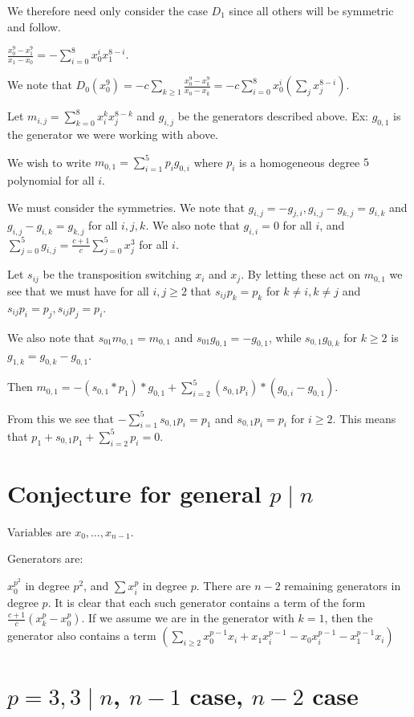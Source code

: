\documentclass{article}
\numberwithin{equation}{section}
\begin{document}
We therefore need only consider the case $D_1$ since all others will be symmetric and follow.

$\frac{x_0^9-x_1^9}{x_1-x_0}=-\sum_{i=0}^8 x_0^ix_1^{8-i}$.

We note that $D_0(x_0^9) = -c\sum_{k \ge 1} \frac{x_0^9-x_k^9}{x_0-x_k} = -c \sum_{i=0}^8 x_0^i(\sum_j x_j^{8-i})$. 

Let $m_{i,j}=\sum_{k=0}^8 x_i^kx_j^{8-k}$ and $g_{i,j}$ be the generators described above. Ex: $g_{0,1}$ is the generator we were working with above. 

We wish to write $m_{0,1}=\sum_{i=1}^5 p_ig_{0,i}$ where $p_i$ is a homogeneous degree $5$ polynomial for all $i$. 

We must consider the symmetries. We note that $g_{i,j}=-g_{j,i}, g_{i,j}-g_{k,j}=g_{i,k}$ and $g_{i,j}-g_{i,k}=g_{k,j}$ for all $i,j,k$. We also note that $g_{i,i}=0$ for all $i$, and $\sum_{j=0}^5 g_{i,j} = \frac{c+1}{c}\sum_{j=0}^5 x_j^3$ for all $i$. 

Let $s_{ij}$ be the transposition switching $x_i$ and $x_j$. By letting these act on $m_{0,1}$ we see that we must have for all $i,j \ge 2$ that $s_{ij}p_k=p_k$ for $k \ne i, k \ne j$ and $s_{ij}p_i=p_j,s_{ij}p_j=p_i$. 

We also note that $s_{01}m_{0,1}=m_{0,1}$ and $s_{01}g_{0,1}=-g_{0,1}$, while $s_{0,1}g_{0,k}$ for $k \ge 2$ is $g_{1,k}=g_{0,k}-g_{0,1}$. 

Then $m_{0,1}=-(s_{0,1}*p_1)*g_{0,1}+\sum_{i=2}^5 (s_{0,1}p_i)*(g_{0,i}-g_{0,1})$. 

From this we see that $-\sum_{i=1}^5 s_{0,1}p_i=p_1$ and $s_{0,1}p_i=p_i$ for $i \ge 2$. This means that $p_1+s_{0,1}p_1+\sum_{i=2}^5 p_i = 0$. 


\section{Conjecture for general $p \mid n$}

Variables are $x_0,\dots,x_{n-1}$.

Generators are:

$x_0^{p^2}$ in degree $p^2$, and $\sum x_i^p$ in degree $p$. There are $n-2$ remaining generators in degree $p$. It is clear that each such generator contains a term of the form $\frac{c+1}{c}(x_k^p-x_0^p)$. If we assume we are in the generator with $k=1$, then the generator also contains a term $\left(\sum_{i \ge 2} x_0^{p-1}x_i+x_1x_i^{p-1}-x_0x_i^{p-1}-x_1^{p-1}x_i\right)$


\section{$p=3,3 \mid n$, $n-1$ case, $n-2$ case}
\end{document}
